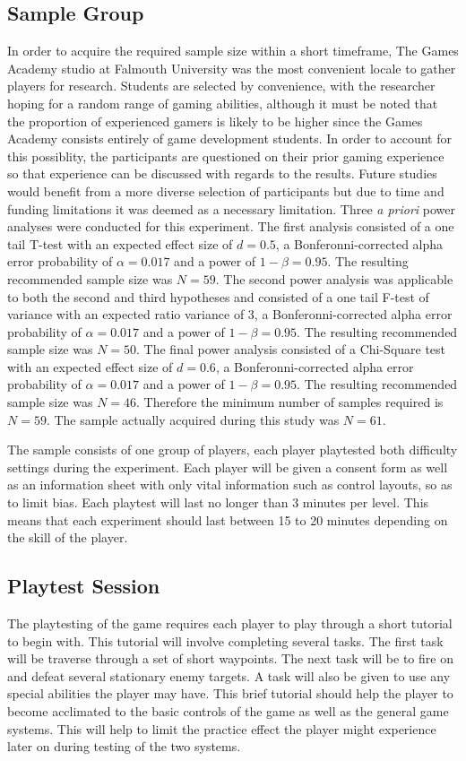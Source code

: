 \documentclass[journal]{IEEEtran}
\begin{document}
\subsection{Sample Group}
In order to acquire the required sample size within a short timeframe, The Games Academy studio at Falmouth University was the most convenient locale to gather players for research. Students are selected by convenience, with the researcher hoping for a random range of gaming abilities, although it must be noted that the proportion of experienced gamers is likely to be higher since the Games Academy consists entirely of game development students. In order to account for this possiblity, the participants are questioned on their prior gaming experience so that experience can be discussed with regards to the results. Future studies would benefit from a more diverse selection of participants but due to time and funding limitations it was deemed as a necessary limitation. Three \textit{a priori} power analyses were conducted for this experiment. The first analysis consisted of a one tail T-test with an expected effect size of $d = 0.5$, a Bonferonni-corrected \cite{weisstein2004bonferroni} alpha error probability of $\alpha = 0.017$ and a power of $1 - \beta = 0.95$. The resulting recommended sample size was $N = 59$. 
The second power analysis was applicable to both the second and third hypotheses and consisted of a one tail F-test of variance with an expected ratio variance of 3, a Bonferonni-corrected  alpha error probability of $\alpha = 0.017$ and a power of $1 - \beta = 0.95$. The resulting recommended sample size was $N = 50$.
The final power analysis consisted of a Chi-Square test with an expected effect size of $d = 0.6$, a Bonferonni-corrected alpha error probability of $\alpha = 0.017$ and a power of $1 - \beta = 0.95$. The resulting recommended sample size was $N = 46$. Therefore the minimum number of samples required is $N = 59$. The sample actually acquired during this study was $N = 61$. 

The sample consists of one group of players, each player playtested both difficulty settings during the experiment. Each player will be given a consent form as well as an information sheet with only vital information such as control layouts, so as to limit bias. Each playtest will last no longer than 3 minutes per level. This means that each experiment should last between 15 to 20 minutes depending on the skill of the player.

\subsection{Playtest Session}
The playtesting of the game requires each player to play through a short tutorial to begin with.  This tutorial will involve completing several tasks. The first task will be traverse through a set of short waypoints. The next task will be to fire on and defeat several stationary enemy targets. A task will also be given to use any special abilities the player may have. This brief tutorial should help the player to become acclimated to the basic controls of the game as well as the general game systems. This will help to limit the practice effect the player might experience later on during testing of the two systems. 
\end{document}
